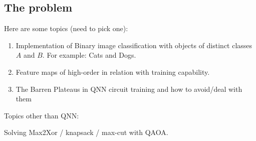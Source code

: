 \subsection{The problem}
Here are some topics (need to pick one):
\begin{enumerate}
    \item Implementation of Binary image classification with objects of distinct classes $A$ and $B$. For example: Cats and Dogs.
    \item Feature maps of high-order in relation with training capability.
    \item The Barren Plateaus in QNN circuit training and how to avoid/deal with them
\end{enumerate}

Topics other than QNN:

Solving Max2Xor / knapsack / max-cut with QAOA.
